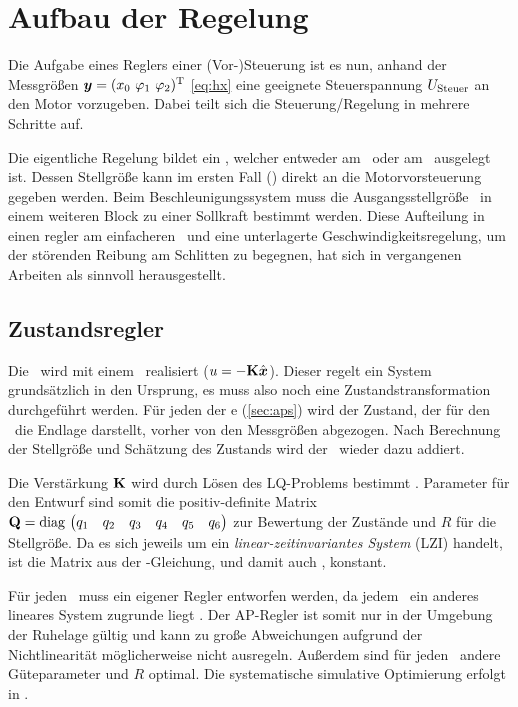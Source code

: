 \section{Aufbau der Regelung}\label{sec:aufbaureg}

Die Aufgabe eines Reglers \bzw einer (Vor-)Steuerung ist es nun, anhand der Messgrößen $\vey=(\xo\ \phe\ \phz)^{\transp}$ \eqref{eq:hx} eine geeignete Steuerspannung $U_{\mathrm{Steuer}}$ an den Motor vorzugeben. Dabei teilt sich die Steuerung/Regelung in mehrere Schritte auf. 

Die eigentliche Regelung bildet ein \zsr, welcher entweder am \krs\ oder am \bss\ ausgelegt ist. 
Dessen Stellgröße kann im ersten Fall (\fsoll) direkt an die Motorvorsteuerung gegeben werden.
Beim Beschleunigungssystem muss die Ausgangsstellgröße \asoll\ in einem weiteren Block zu einer Sollkraft bestimmt werden.
Diese Aufteilung in einen \ap regler am einfacheren \bss\ und eine unterlagerte Geschwindigkeitsregelung, um der störenden Reibung am Schlitten zu begegnen, hat sich in vergangenen Arbeiten als sinnvoll herausgestellt.


\subsection{Zustandsregler}\label{subsec:zsr} 

Die \aprg\ wird mit einem \zsr\ realisiert ($u=-{\boldsymbol{\mathrm{K}}} \hat{\boldsymbol{x}}$). 
Dieser regelt ein System grundsätzlich in den Ursprung, es muss also noch eine Zustandstransformation durchgeführt werden. 
Für jeden der \ap e (\ref{sec:aps}) wird der Zustand, der für den \zsr\ die Endlage darstellt, vorher von den Messgrößen abgezogen. 
Nach Berechnung der Stellgröße und Schätzung des Zustands wird der \ap\ wieder dazu addiert.

Die Verstärkung ${\boldsymbol{\mathrm{K}}}$ wird durch Lösen des LQ-Problems bestimmt \cite{AdamyRT2}. Parameter für den Entwurf sind somit die positiv-definite Matrix 
${\boldsymbol{\mathrm{Q}}}=\mathrm{diag} \, \left(\begin{matrix} q_1 & q_2 & q_3 & q_4 & q_5 & q_6 \end{matrix}\right)$
 zur Bewertung der Zustände und $R$ für die Stellgröße. 
Da es sich jeweils um ein \emph{linear-zeitinvariantes System} (LZI) handelt, ist die Matrix  aus der \ricc-Gleichung, und damit auch , konstant.

Für jeden \ap\ muss ein eigener Regler entworfen werden, da jedem \ap\ ein anderes lineares System zugrunde liegt .
Der AP-Regler ist somit nur in der Umgebung der Ruhelage gültig und kann zu große Abweichungen aufgrund der Nichtlinearität möglicherweise nicht ausregeln.
Außerdem sind für jeden \ap\ andere Güteparameter  und $R$ optimal. Die systematische simulative Optimierung erfolgt in .

